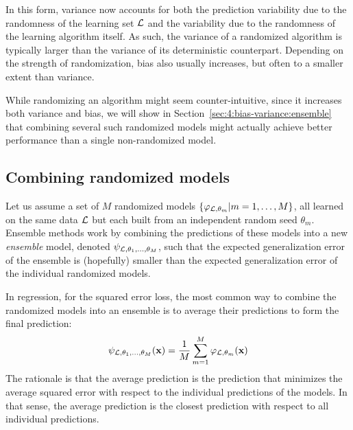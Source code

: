 In this form, variance now accounts for both the prediction variability due to
the randomness of the learning set ${\cal L}$ and the variability due to the
randomness of the learning algorithm itself. As such, the variance of a
randomized algorithm is typically larger than the variance of its
deterministic counterpart. Depending on the strength of randomization, bias
also usually increases, but often to a smaller extent than variance.

While randomizing an algorithm might seem counter-intuitive, since it
increases both variance and bias, we will show in Section~\ref{sec:4:bias-variance:ensemble}
that combining several such randomized models might actually
achieve better performance than a single non-randomized model.


\subsection{Combining randomized models}

Let us assume a set of $M$ randomized models $\{\varphi_{{\cal L}, \theta_m} |
m = 1, \dots, M \}$, all learned on the same data ${\cal L}$ but each built
from an independent random seed $\theta_m$. Ensemble methods work by combining
the predictions of these models into a new \textit{ensemble} model, denoted
$\psi_{{\cal L},\theta_1,\dots,\theta_M}$, such that the expected
generalization error of the ensemble is (hopefully) smaller than the expected
generalization error of the individual randomized models.

In regression, for the squared error loss, the most common way to combine the
randomized models into an ensemble is to average their predictions to form the
final prediction:
\begin{equation}\label{eqn:4:averaging}
\psi_{{\cal L},\theta_1,\dots,\theta_M}(\mathbf{x}) = \frac{1}{M} \sum_{m=1}^M \varphi_{{\cal L},\theta_m}(\mathbf{x})
\end{equation}
The rationale is that the average prediction is the prediction that minimizes the average
squared error with respect to the individual predictions of the models. In that sense, the average prediction is the closest prediction with respect to all individual predictions.

